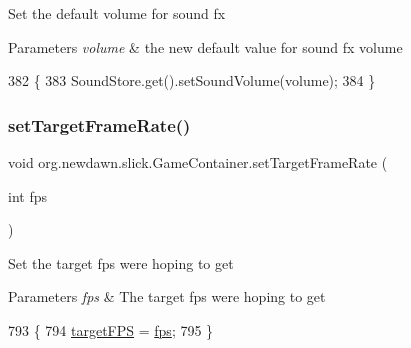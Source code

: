 Set the default volume for sound fx 
\begin{DoxyParams}{Parameters}
{\em volume} & the new default value for sound fx volume \\
\hline
\end{DoxyParams}

\begin{DoxyCode}
382                                              \{
383         SoundStore.get().setSoundVolume(volume);
384     \}
\end{DoxyCode}
\mbox{\label{classorg_1_1newdawn_1_1slick_1_1_game_container_a223f9078e49a977358a2714c47fc91c3}} 
\subsubsection{\texorpdfstring{set\+Target\+Frame\+Rate()}{setTargetFrameRate()}}
{\footnotesize\ttfamily void org.\+newdawn.\+slick.\+Game\+Container.\+set\+Target\+Frame\+Rate (\begin{DoxyParamCaption}\item[{int}]{fps }\end{DoxyParamCaption})\hspace{0.3cm}{\ttfamily [inline]}}

Set the target fps we\textquotesingle{}re hoping to get


\begin{DoxyParams}{Parameters}
{\em fps} & The target fps we\textquotesingle{}re hoping to get \\
\hline
\end{DoxyParams}

\begin{DoxyCode}
793                                             \{
794         \mbox{\hyperlink{classorg_1_1newdawn_1_1slick_1_1_game_container_a2b2c1237fa5ca2e45a98d70c6196a8b4}{targetFPS}} = \mbox{\hyperlink{classorg_1_1newdawn_1_1slick_1_1_game_container_aee0fed3a01c1063c678bfb7b1d950aa1}{fps}};
795     \}
\end{DoxyCode}
\mbox{\label{classorg_1_1newdawn_1_1slick_1_1_game_container_a9e04385f8de0ccfad5ed732e7ae11f4f}} 

